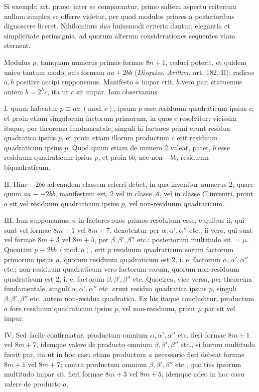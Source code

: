 %
Si exempla art. praec. inter se comparantur, primo saltem aspectu criterium nullum simplex se offerre videtur, per quod modulos priores a posterioribus dignoscere liceret. Nihilominus \emph{duo} huiusmodi criteria dantur, elegantia et simplicitate perinsignia, ad quorum alterum considerationes sequentes viam sternent.

Modulus $p$, tamquam numerus primus formae $8n+1$, reduci poterit, et quidem unico tantum modo, sub formam $aa+2bb$ (\emph{Disquiss. Arithm.} art. 182, II); radices $a,b$ positive accipi supponemus. Manifesto $a$ impar erit, $b$ vero par; statuemus autem $b=2^\lambda c$, ita ut $c$ sit impar. Iam observamus

I. quum habeatur $p\equiv aa\ (\mathrm{mod.}\ c)$, ipsum $p$ esse residuum quadraticum ipsius $c$, et proin etiam singulorum factorum primorum, in quos $c$ resolvitur: vicissim itaque, per theorema fundamentale, singuli hi factores primi erunt residua quadratica ipsius $p$, et proin etiam illorum productum $c$ erit residuum quadraticum ipsius $p$. Quod quum etiam de numero $2$ valeat, patet, $b$ esse residuum quadraticum ipsius $p$, et proin $bb$, nec non $-bb$, residuum biquadraticum.

II. Hinc $-2bb$ ad eandem classem referri debet, in qua invenitur numerus $2$; quare quum $aa\equiv-2bb$, manifestum est, $2$ vel in classe $A$, vel in classe $C$ inveniri, prout $a$ sit vel residuum quadraticum ipsius $p$, vel non-residuum quadraticum.

III. Iam supponamus, $a$ in factores suos primos resolutum esse, e quibus ii, qui sunt vel formae $8m+1$ vel $8m+7$, denotentur per $\alpha,\alpha',\alpha''$ etc., ii vero, qui sunt vel formae $8m+3$ vel $8m+5$, per $\beta,\beta',\beta''$ etc.: posteriorum multitudo sit $=\mu$. Quoniam $p\equiv2bb\ (\mathrm{mod.}\ a)$, erit $p$ residuum quadraticum eorum factorum primorum ipsius $a$, quorum residuum quadraticum est $2$, i. e. factorum $\alpha,\alpha',\alpha''$ etc.; non-residuum quadraticum vero factorum eorum, quorum non-residuum quadraticum est $2$, i. e. factorum $\beta,\beta',\beta''$ etc. Quocirca, vice versa, per theorema fundamentale, singuli $\alpha,\alpha',\alpha''$ etc. erunt residua quadratica ipsius $p$, singuli $\beta,\beta',\beta''$ etc. autem non-residua quadratica. Ex his itaque concluditur, productum $a$ fore residuum quadraticum ipsius $p$, vel non-residuum, prout $\mu$ par sit vel impar.

IV. Sed facile confirmatur, productum omnium $\alpha,\alpha',\alpha''$ etc. fieri formae $8m+1$ vel $8m+7$, idemque valere de producto omnium $\beta,\beta',\beta''$ etc., si horum multitudo fuerit par, ita ut in hoc casu etiam productum $a$ necessario fieri debeat formae $8m+1$ vel $8m+7$; contra productum omnium $\beta,\beta',\beta''$ etc., quo%
%
ties ipsorum multitudo impar sit, fieri formae $8m+3$ vel $8m+5$, idemque adeo in hoc casu valere de producto $a$.

